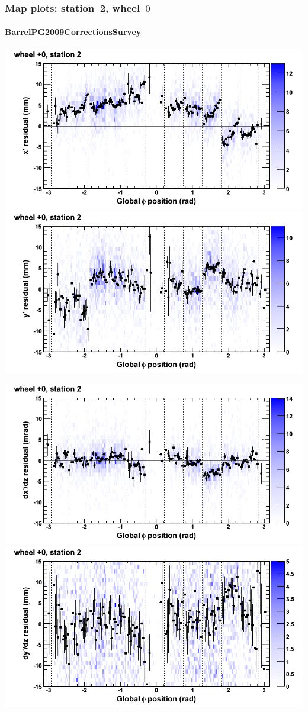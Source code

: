 \documentclass[compress]{beamer}
\begin{document}
\begin{frame}
\frametitle{Map plots: station~2, wheel~$0$}
\framesubtitle{BarrelPG2009CorrectionsSurvey}
\includegraphics[width=0.5\linewidth]{mapplots_01/DTvsphi_st2whC_x.png}
\includegraphics[width=0.5\linewidth]{mapplots_01/DTvsphi_st2whC_y.png}

\includegraphics[width=0.5\linewidth]{mapplots_01/DTvsphi_st2whC_dxdz.png}
\includegraphics[width=0.5\linewidth]{mapplots_01/DTvsphi_st2whC_dydz.png}
\end{frame}
\end{document}
